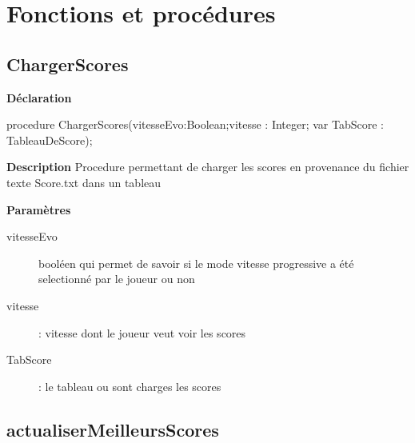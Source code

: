 \documentclass{report}
\newif\ifpdf
\begin{document}
\section{Fonctions et procédures}
\ifpdf
\subsection*{\large{\textbf{ChargerScores}}\normalsize\hspace{1ex}\hrulefill}
\else
\subsection*{ChargerScores}
\fi
\label{GestionScore-ChargerScores}
\begin{list}{}{
\setlength{\itemindent}{0cm}
\setlength{\listparindent}{0cm}
\setlength{\leftmargin}{\evensidemargin}
\addtolength{\leftmargin}{\tmplength}
\settowidth{\labelsep}{X}
\addtolength{\leftmargin}{\labelsep}
\setlength{\labelwidth}{\tmplength}
}
\item[\textbf{Déclaration}\hfill]
\ifpdf
\begin{flushleft}
\fi
\begin{ttfamily}
procedure ChargerScores(vitesseEvo:Boolean;vitesse : Integer; var TabScore : TableauDeScore);\end{ttfamily}

\ifpdf
\end{flushleft}
\fi

\par
\item[\textbf{Description}]
Procedure permettant de charger les scores en provenance du fichier texte Score.txt dans un tableau   \par
\item[\textbf{Paramètres}]
\begin{description}
\item[vitesseEvo] booléen qui permet de savoir si le mode vitesse progressive a été selectionné par le joueur ou non
\item[vitesse] : vitesse dont le joueur veut voir les scores
\item[TabScore] : le tableau ou sont charges les scores
\end{description}


\end{list}
\ifpdf
\subsection*{\large{\textbf{actualiserMeilleursScores}}\normalsize\hspace{1ex}\hrulefill}
\else
\end{document}
